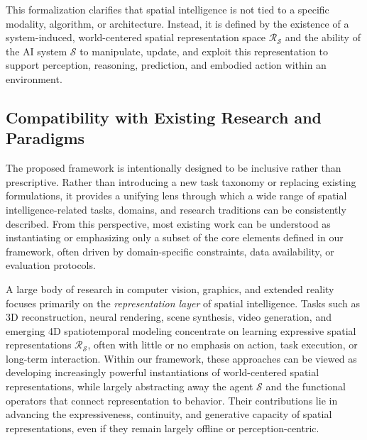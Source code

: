 This formalization clarifies that spatial intelligence is not tied to a specific modality, algorithm, or architecture.
Instead, it is defined by the existence of a system-induced, world-centered spatial representation space $\mathcal{R}_{\mathcal{S}}$ and the ability of the AI system $\mathcal{S}$ to manipulate, update, and exploit this representation to support perception, reasoning, prediction, and embodied action within an environment.










\subsection{Compatibility with Existing Research and Paradigms}
\label{subsec:p1-sec2-compatibility-with-existing-research-and-paradigms}

The proposed framework is intentionally designed to be inclusive rather than prescriptive.
Rather than introducing a new task taxonomy or replacing existing formulations, it provides a unifying lens through which a wide range of spatial intelligence-related tasks, domains, and research traditions can be consistently described.
From this perspective, most existing work can be understood as instantiating or emphasizing only a subset of the core elements defined in our framework, often driven by domain-specific constraints, data availability, or evaluation protocols.


A large body of research in computer vision, graphics, and extended reality focuses primarily on the \emph{representation layer} of spatial intelligence.
Tasks such as 3D reconstruction, neural rendering, scene synthesis, video generation, and emerging 4D spatiotemporal modeling concentrate on learning expressive spatial representations $\mathcal{R}_{\mathcal{S}}$, often with little or no emphasis on action, task execution, or long-term interaction.
Within our framework, these approaches can be viewed as developing increasingly powerful instantiations of world-centered spatial representations, while largely abstracting away the agent $\mathcal{S}$ and the functional operators that connect representation to behavior.
Their contributions lie in advancing the expressiveness, continuity, and generative capacity of spatial representations, even if they remain largely offline or perception-centric.



